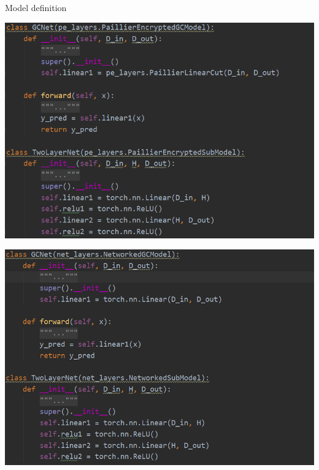 \documentclass[xcolor=dvipsnames]{beamer}
\begin{document}
\begin{frame}{Model definition}
    \begin{minipage}{.5\textwidth}
      \centering
      \includegraphics[width=1\linewidth]{images/gcnet.png}
      \label{fig:gcnet}
    \end{minipage}%
    \begin{minipage}{.5\textwidth}
      \centering
      \includegraphics[width=1\linewidth]{images/unencryptedgcnet.png}
      \label{fig:unencryptedgcnet}
    \end{minipage}
\end{frame}
\end{document}
